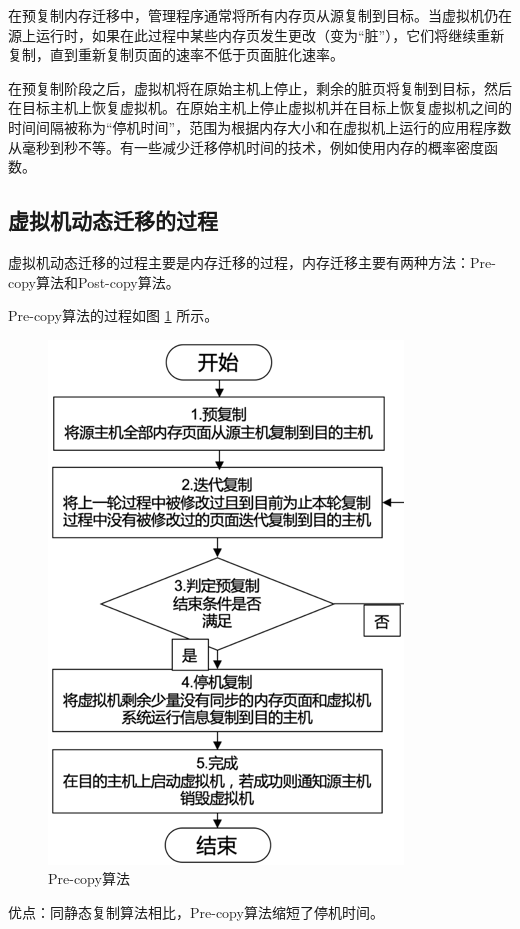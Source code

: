 在预复制内存迁移中，管理程序通常将所有内存页从源复制到目标。当虚拟机仍在源上运行时，如果在此过程中某些内存页发生更改（变为“脏”），它们将继续重新复制，直到重新复制页面的速率不低于页面脏化速率。

在预复制阶段之后，虚拟机将在原始主机上停止，剩余的脏页将复制到目标，然后在目标主机上恢复虚拟机。在原始主机上停止虚拟机并在目标上恢复虚拟机之间的时间间隔被称为“停机时间”，范围为根据内存大小和在虚拟机上运行的应用程序数从毫秒到秒不等。有一些减少迁移停机时间的技术，例如使用内存的概率密度函数。

\subsection{虚拟机动态迁移的过程}
虚拟机动态迁移的过程主要是内存迁移的过程，内存迁移主要有两种方法：Pre-copy算法和Post-copy算法\cite{Aidan}。

Pre-copy算法的过程如图 \ref{Fig:chap2_2} 所示。

\begin{figure}[!htb]
  \centering
  \includegraphics{./Figure/IMG_Chap2_2.png}
  \caption{Pre-copy算法}\label{Fig:chap2_2}
\end{figure}

优点：同静态复制算法相比，Pre-copy算法缩短了停机时间。

